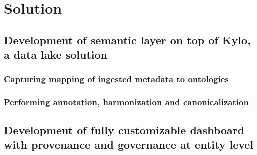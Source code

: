 %

\chapter{Solution}
\label{ownwork} 
\section{Development of semantic layer on top of Kylo, a data lake solution}
\label{ownwork.bigdatalake}

\subsection{Capturing mapping of ingested metadata to ontologies}
\label{ownwork.nifi}
\subsection{Performing annotation, harmonization and canonicalization}
\label{ownwork.standardization}

\section{Development of  fully customizable dashboard with provenance and governance at entity level}
\label{ownwork.zeppelin}



